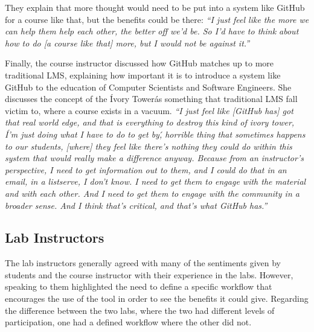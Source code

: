 They explain that more thought would need to be put into a system like GitHub for a course like that, but the benefits could be there: \textit{``I just feel like the more we can help them help each other, the better off we'd be. So I'd have to think about how to do [a course like that] more, but I would not be against it.''}

Finally, the course instructor discussed how GitHub matches up to more traditional LMS, explaining how important it is to introduce a system like GitHub to the education of Computer Scientists and Software Engineers. She discusses the concept of the \'Ivory Tower\' as something that traditional LMS fall victim to, where a course exists in a vacuum. \textit{``I just feel like [GitHub has] got that real world edge, and that is everything to destroy this kind of ivory tower, \'I'm just doing what I have to do to get by\', horrible thing that sometimes happens to our students, [where] they feel like there's nothing they could do within this system that would really make a difference anyway. Because from an instructor's perspective, I need to get information out to them, and I could do that in an email, in a listserve, I don't know. I need to get them to engage with the material and with each other. And I need to get them to engage with the community in a broader sense. And I think that's critical, and that's what GitHub has.''}



\subsection{Lab Instructors}
The lab instructors generally agreed with many of the sentiments given by students and the course instructor with their experience in the labs. However, speaking to them highlighted the need to define a specific workflow that encourages the use of the tool in order to see the benefits it could give. Regarding the difference between the two labs, where the two had different levels of participation, one had a defined workflow where the other did not.

